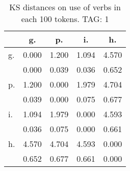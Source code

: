 \begin{table}[h!]
\begin{center}
\begin{tabular}{| l | c | c | c | c |}\hline
 & g. & p. & i. & h. \\\hline
g. & 0.000  & 1.200  & 1.094  & 4.570 \\\hline
 & 0.000  & 0.039  & 0.036  & 0.652 \\\hline
p. & 1.200  & 0.000  & 1.979  & 4.704 \\\hline
 & 0.039  & 0.000  & 0.075  & 0.677 \\\hline
i. & 1.094  & 1.979  & 0.000  & 4.593 \\\hline
 & 0.036  & 0.075  & 0.000  & 0.661 \\\hline
h. & 4.570  & 4.704  & 4.593  & 0.000 \\\hline
 & 0.652  & 0.677  & 0.661  & 0.000 \\\hline
\end{tabular}
\caption{KS distances on use of verbs in each 100 tokens. TAG: 1}
\end{center}
\end{table}